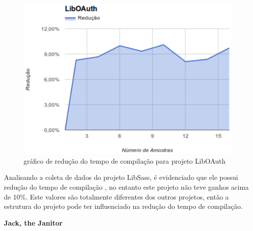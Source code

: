 \begin{figure}[h]
    \centering
        \includegraphics[keepaspectratio=true,scale=1]{figuras/liboauth.eps}
    \caption{gráfico de redução do tempo de compilação para projeto LibOAuth}
    \label{liboauth}
\end{figure}

Analisando a coleta de dados do projeto LibSass, é evidenciado que ele possui
 redução do tempo de compilação , no entanto este projeto não teve ganhos
 acima de 10\%. Este valores são totalmente diferentes dos outros projetos,
 então a estrutura do projeto pode ter influenciado na redução do
 tempo de compilação. 

\textbf{Jack, the Janitor}

